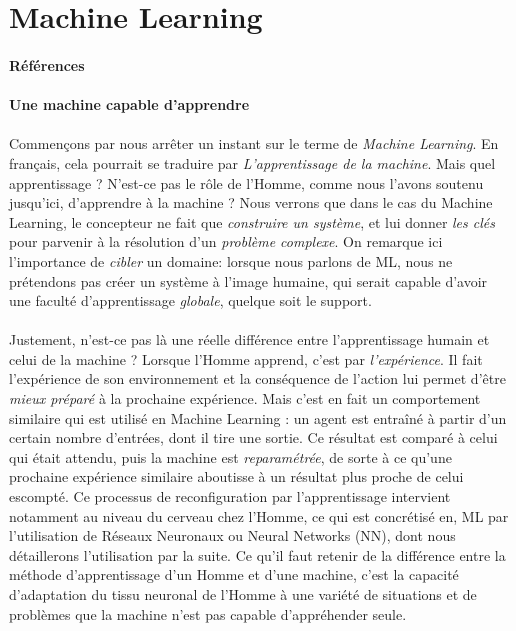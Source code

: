 \section{Machine Learning}
\paragraph{Références} \cite{AlphaGo0} \cite{AlphaGo1} \cite{Internet3} \cite{Internet4} \cite{Internet5}

\paragraph{Une machine capable d'apprendre}

\paragraph {} Commençons par nous arrêter un instant sur le terme de \emph{Machine Learning}. En français,
cela pourrait se traduire par \emph{L'apprentissage de la machine}. Mais quel apprentissage ? N'est-ce pas
le rôle de l'Homme, comme nous l'avons soutenu jusqu'ici, d'apprendre à la machine ? Nous verrons que dans
le cas du Machine Learning, le concepteur ne fait que \emph{construire un système}, et lui donner
\emph{les clés} pour parvenir à la résolution d'un \emph{problème complexe}. On remarque ici l'importance
de \emph{cibler} un domaine: lorsque nous parlons de ML, nous ne prétendons pas créer un système à l'image
humaine, qui serait capable d'avoir une faculté d'apprentissage \emph{globale}, quelque soit le support. 

\paragraph{} Justement, n'est-ce pas là une réelle différence entre l'apprentissage humain et celui de la machine ?
Lorsque l'Homme apprend, c'est par \emph{l'expérience}. Il fait l'expérience de son environnement et la
conséquence de l'action lui permet d'être \emph{mieux préparé} à la prochaine expérience. Mais c'est en fait un
comportement similaire qui est utilisé en Machine Learning : un agent est entraîné à partir d'un certain nombre
d'entrées, dont il tire une sortie. Ce résultat est comparé à celui qui était attendu, puis la machine est
\emph{reparamétrée}, de sorte à ce qu'une prochaine expérience similaire aboutisse à un résultat plus proche 
de celui escompté. Ce processus de reconfiguration par l'apprentissage intervient notamment au niveau du cerveau
chez l'Homme, ce qui est concrétisé en, ML par l'utilisation de Réseaux Neuronaux ou Neural Networks (NN), dont
nous détaillerons l'utilisation par la suite. Ce qu'il faut retenir de la différence entre la méthode d'apprentissage
d'un Homme et d'une machine, c'est la capacité d'adaptation du tissu neuronal de l'Homme à une variété de situations
et de problèmes que la machine n'est pas capable d'appréhender seule.

